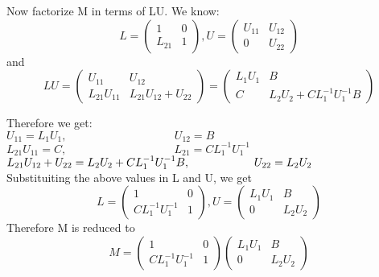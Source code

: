 \documentclass[12pt, oneside]{article}   	%
\begin{document}
\begin{enumerate}
\begin{enumerate}
 Now factorize M in terms of LU.
 We know: 
$$
L= \left(\begin{array}{cc} 1 & 0\\ L_{21} & 1 \end{array}\right) , U=\left(\begin{array}{cc} U_{11} & U_{12}\\ 0& U_{22} \end{array}\right)
$$ and
$$
 LU= \begin{pmatrix}
U_{11}&  U_{12}\\
L_{21}U_{11} & L_{21}U_{12}+U_{22} 
\end{pmatrix} 
=\begin{pmatrix}
L_1U_1& B\\
C & L_2U_2+CL_1^{-1}U_1^{-1}B
\end{pmatrix} 
$$ 

Therefore we get:\\


\hspace{1cm}$U_{11}=L_1U_1,\hspace{4cm}
U_{12}=B$\\

\hspace{1cm}$L_{21}U_{11}=C,\hspace{4cm}L_{21}= CL_1^{-1}U_1^{-1}$\\

\hspace{1cm}$L_{21}U_{12}+U_{22} = L_2U_2+CL_1^{-1}U_1^{-1}B, 
\hspace{2cm}U_{22} =L_2U_2\\
$\\


Substituiting the above values in L and U, we get\\
$$
L= \left(\begin{array}{cc} 1 & 0\\ CL_1^{-1}U_1^{-1}& 1 \end{array}\right) , U=
\left(\begin{array}{cc}L_1U_1& B\\ 0& L_2U_2 \end{array}\right)
$$
Therefore M is reduced to 
$$
M= \left(\begin{array}{cc} 1 & 0\\ CL_1^{-1}U_1^{-1}& 1 \end{array}\right)
\left(\begin{array}{cc}L_1U_1& B\\ 0& L_2U_2 \end{array}\right)
$$ 
\end{enumerate}
\end{enumerate}
\end{document}
